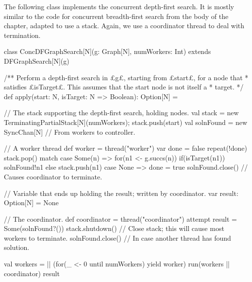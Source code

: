 \begin{answerI}
The following class implements the concurrent depth-first search.  It is
mostly similar to the code for concurrent breadth-first search from the body
of the chapter, adapted to use a stack.  Again, we use a coordinator thread to
deal with termination.
%
\begin{scala}
class ConcDFGraphSearch[N](g: Graph[N], numWorkers: Int)
     extends DFGraphSearch[N](g){
  /** Perform a depth-first search in £g£, starting from £start£, for a node that
    * satisfies £isTarget£.  This assumes that the start node is not itself a
    * target. */
  def apply(start: N, isTarget: N => Boolean): Option[N] = {
    // The stack supporting the depth-first search, holding nodes.
    val stack = new TerminatingPartialStack[N](numWorkers); stack.push(start)
    val solnFound = new SyncChan[N] // From workers to controller.

    // A worker thread
    def worker = thread("worker"){
      var done = false
      repeat(!done){
        stack.pop() match{
          case Some(n) => 
            for(n1 <- g.succs(n)){
              if(isTarget(n1)) solnFound!n1 else stack.push(n1)
            }
          case None => done = true
        }
      }
      solnFound.close() // Causes coordinator to terminate.
    }

    // Variable that ends up holding the result; written by coordinator. 
    var result: Option[N] = None

    // The coordinator.
    def coordinator = thread("coordinator"){
      attempt{ result = Some(solnFound?()) }{ }
      stack.shutdown() // Close stack; this will cause most workers to terminate.
      solnFound.close() // In case another thread has found solution.
    }

    val workers = || (for(_ <- 0 until numWorkers) yield worker)
    run(workers || coordinator)
    result
  }
}
\end{scala}
\end{answerI}
